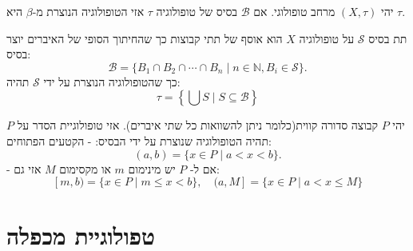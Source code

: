 \documentclass{tstextbook}
\begin{document}
\begin{proposition}
יהי \(\left( X,\tau \right)\) מרחב טופולוגי. אם \(\mathcal{B}\) בסיס של טופולוגיה \(\tau\) אזי הטופולוגיה הנוצרת מ-\(\beta\) היא \(\tau\).

\end{proposition}
\begin{definition}[תת בסיס]
תת בסיס \(\mathcal{S}\) על טופולוגיה \(X\) הוא אוסף של תתי קבוצות כך שהחיתוך הסופי של האיברים יוצר בסיס:
$${\mathcal{B}}=\{B_{1}\cap B_{2}\cap\cdots\cap B_{n}\mid n\in\mathbb{N},B_{i}\in{\mathcal{S}}\}.$$
כך שהטופולוגיה הנוצרת על ידי \(\mathcal{S}\) תהיה:
$$\tau=\left\{\bigcup S\mid S\subseteq\mathcal{B}\right\}$$

\end{definition}
\begin{definition}
יהי \(P\) קבוצה סדורה קווית(כלומר ניתן להשוואות כל שתי איברים). אזי טופולוגיית הסדר על \(P\) תהיה הטופולוגיה שנוצרת על ידי הבסיס:
- הקטעים הפתוחים:
$$(a,b)=\{x\in P\mid a<x<b\}.$$
- אם ל- \(P\) יש מינימום \(m\) או מקסימום \(M\) אזי גם:
$$[m,b)=\{x\in P\mid m\leq x<b\},\quad(a,M]=\{x\in P\mid a<x\leq M\}$$

\end{definition}
\section{טפולוגיית מכפלה}
\end{document}

